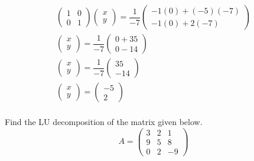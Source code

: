 \documentclass[12pt,letterpaper]{exam}
\begin{document}
\begin{questions}
{\[\begin{gathered}
	\begin{pmatrix} 1 & 0 \\ 0 & 1 \end{pmatrix} \begin{pmatrix} x \\ y \end{pmatrix}= \dfrac{1}{-7} \begin{pmatrix} -1(0) + (-5)(-7) \\ -1(0) + 2(-7) \end{pmatrix} \\[0.3cm]
	\begin{pmatrix} x \\ y \end{pmatrix}= \dfrac{1}{-7} \begin{pmatrix} 0 + 35 \\ 0 - 14 \end{pmatrix} \\[0.3cm]
	\begin{pmatrix} x \\ y \end{pmatrix}= \dfrac{1}{-7} \begin{pmatrix} 35 \\ -14 \end{pmatrix} \\[0.3cm]
	\boxed{\begin{pmatrix} x \\ y \end{pmatrix}= \begin{pmatrix} -5 \\ 2 \end{pmatrix}} \\[0.3cm]
	\end{gathered}
	\]
}






\newpage
\question[10] Find the LU decomposition of the matrix given below.
	\[
	A= \begin{pmatrix} 3 & 2 & 1 \\ 9 & 5 & 8 \\ 0 & 2 & -9 \end{pmatrix}
	\] \par\vspace{0.2cm}


\end{questions}
\end{document}

